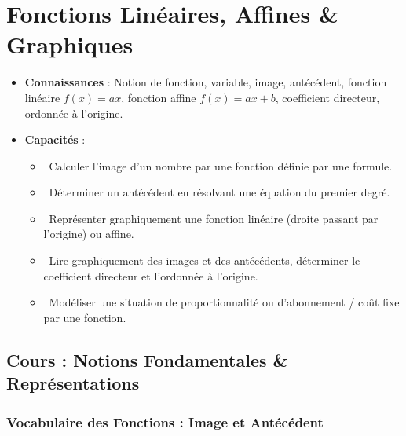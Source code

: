 \chapter{Fonctions Linéaires, Affines \& Graphiques}
\label{chap:fonctions_affines}

\begin{cadreretenu}
\begin{itemize}
    \item \textbf{Connaissances} : Notion de fonction, variable, image, antécédent, fonction linéaire $f(x)=ax$, fonction affine $f(x)=ax+b$, coefficient directeur, ordonnée à l'origine.
    \item \textbf{Capacités} :
    \begin{itemize}
        \item \capRealiser\ Calculer l'image d'un nombre par une fonction définie par une formule.
        \item \capRealiser\ Déterminer un antécédent en résolvant une équation du premier degré.
        \item \capRealiser\ Représenter graphiquement une fonction linéaire (droite passant par l'origine) ou affine.
        \item \capAnalyser\ Lire graphiquement des images et des antécédents, déterminer le coefficient directeur et l'ordonnée à l'origine.
        \item \capValider\ Modéliser une situation de proportionnalité ou d'abonnement / coût fixe par une fonction.
    \end{itemize}
\end{itemize}
\end{cadreretenu}

\vspace{0.3cm}

\section{Cours : Notions Fondamentales \& Représentations}

\subsection{Vocabulaire des Fonctions : Image et Antécédent}

